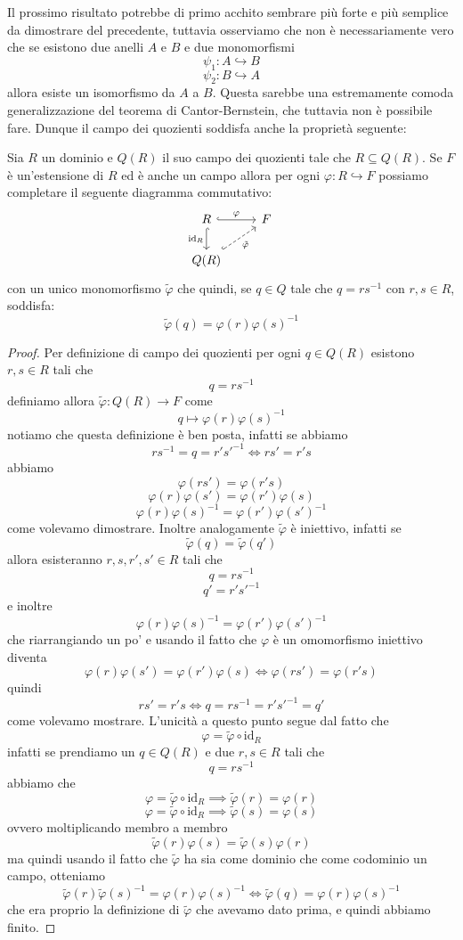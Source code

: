 \documentclass[11pt]{scrartcl}
\newcommand{\inj}{\hookrightarrow}
\begin{document}
	Il prossimo risultato potrebbe di primo acchito sembrare più forte e più semplice da dimostrare del precedente, tuttavia osserviamo che non è necessariamente vero che se esistono due anelli $A$ e $B$ e due monomorfismi
	$$\psi_1:A\inj B$$
	$$\psi_2:B\inj A$$
	allora esiste un isomorfismo da $A$ a $B$. Questa sarebbe una estremamente comoda generalizzazione del teorema di Cantor-Bernstein, che tuttavia non è possibile fare. Dunque il campo dei quozienti soddisfa anche la proprietà seguente:
	\begin{theorem}
		Sia $R$ un dominio e $Q(R)$ il suo campo dei quozienti tale che $R\subseteq Q(R)$. Se $F$ è un'estensione di $R$ ed è anche un campo allora per ogni $\varphi:R\inj F$ possiamo completare il seguente diagramma commutativo:
		$$
		\begin{tikzcd}
			R \arrow[r,"\varphi",hook]\arrow[d,"\text{id}_R",hook,swap] & F	\\
			Q(R) \arrow[hook,dashed,"\tilde{\varphi}",ur,swap] &
		\end{tikzcd}
		$$
		con un unico monomorfismo $\tilde{\varphi}$ che quindi, se $q\in Q$ tale che $q=rs^{-1}$ con $r,s\in R$,  soddisfa:
		$$\tilde{\varphi}(q)=\varphi(r)\varphi(s)^{-1}$$
	\end{theorem}
	\begin{proof}
		Per definizione di campo dei quozienti per ogni $q\in Q(R)$ esistono $r,s\in R$ tali che 
		$$q=rs^{-1}$$
		definiamo allora $\tilde{\varphi}:Q(R)\to F$ come
		$$q\mapsto \varphi(r)\varphi(s)^{-1}$$
		notiamo che questa definizione è ben posta, infatti se abbiamo 
		$$rs^{-1}=q=r's'^{-1} \iff rs'=r's$$
		abbiamo
		$$\varphi(rs')=\varphi(r's)$$
		$$\varphi(r)\varphi(s')=\varphi(r')\varphi(s)$$
		$$\varphi(r)\varphi(s)^{-1}=\varphi(r')\varphi(s')^{-1}$$
		come volevamo dimostrare. Inoltre analogamente $\tilde{\varphi}$ è iniettivo, infatti se 
		$$\tilde{\varphi}(q)=\tilde{\varphi}(q')$$
		allora esisteranno $r,s,r',s'\in R$ tali che 
		$$q=rs^{-1}$$
		$$q'=r's'^{-1}$$
		e inoltre
		$$\varphi(r)\varphi(s)^{-1}=\varphi(r')\varphi(s')^{-1}$$
		che riarrangiando un po' e usando il fatto che $\varphi$ è un omomorfismo iniettivo diventa
		$$\varphi(r)\varphi(s')=\varphi(r')\varphi(s) \iff \varphi(rs')=\varphi(r's)$$
		quindi
		$$rs'=r's \iff q=rs^{-1}=r's'^{-1}=q'$$
		come volevamo mostrare. L'unicità a questo punto segue dal fatto che 
		$$\varphi=\tilde{\varphi}\circ \text{id}_R$$
		infatti se prendiamo un $q\in Q(R)$ e due $r,s\in R$ tali che
		$$q=rs^{-1}$$
		abbiamo che 
		$$\varphi=\tilde{\varphi}\circ \text{id}_R \implies \tilde{\varphi}(r)=\varphi(r)$$
		$$\varphi=\tilde{\varphi}\circ \text{id}_R \implies \tilde{\varphi}(s)=\varphi(s)$$
		ovvero moltiplicando membro a membro
		$$\tilde{\varphi}(r)\varphi(s)=\tilde{\varphi}(s)\varphi(r)$$
		ma quindi usando il fatto che $\tilde{\varphi}$ ha sia come dominio che come codominio un campo, otteniamo
		$$\tilde{\varphi}(r)\tilde{\varphi}(s)^{-1}=\varphi(r)\varphi(s)^{-1} \iff \tilde{\varphi}(q)=\varphi(r)\varphi(s)^{-1}$$
		che era proprio la definizione di $\tilde{\varphi}$ che avevamo dato prima, e quindi abbiamo finito.
	\end{proof}
\end{document}
